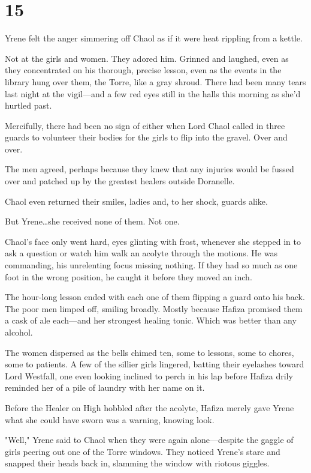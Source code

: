 
\chapter{15}

Yrene felt the anger simmering off Chaol as if it were heat rippling from a kettle.

Not at the girls and women.
They adored him.
Grinned and laughed, even as they concentrated on his thorough, precise lesson, even as the events in the library hung over them, the Torre, like a gray shroud.
There had been many tears last night at the vigil---and a few red eyes still in the halls this morning as she'd hurtled past.

Mercifully, there had been no sign of either when Lord Chaol called in three guards to volunteer their bodies for the girls to flip into the gravel.
Over and over.

The men agreed, perhaps because they knew that any injuries would be fussed over and patched up by the greatest healers outside Doranelle.

Chaol even returned their smiles, ladies and, to her shock, guards alike.

But Yrene\ldots she received none of them.
Not one.

Chaol's face only went hard, eyes glinting with frost, whenever she stepped in to ask a question or watch him walk an acolyte through the motions.
He was commanding, his unrelenting focus missing nothing.
If they had so much as one foot in the wrong position, he caught it before they moved an inch.

The hour-long lesson ended with each one of them flipping a guard onto his back.
The poor men limped off, smiling broadly.
Mostly because Hafiza promised them a cask of ale each---and her strongest healing tonic.
Which was better than any alcohol.

The women dispersed as the bells chimed ten, some to lessons, some to chores, some to patients.
A few of the sillier girls lingered, batting their eyelashes toward Lord Westfall, one even looking inclined to perch in his lap before Hafiza drily reminded her of a pile of laundry with her name on it.

Before the Healer on High hobbled after the acolyte, Hafiza merely gave Yrene what she could have sworn was a warning, knowing look.

"Well," Yrene said to Chaol when they were again alone---despite the gaggle of girls peering out one of the Torre windows.
They noticed Yrene's stare and snapped their heads back in, slamming the window with riotous giggles.

